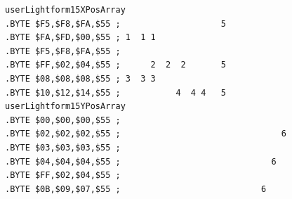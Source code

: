 \begin{minipage}[b]{0.48\linewidth}
\begin{lrbox}{\mybox}%
\hspace{1cm}
\begin{lstlisting}[basicstyle=\ttfamily\tiny,escapechar=\%]
userLightform15XPosArray
.BYTE $F5,$F8,$FA,$55 ;                    5            
.BYTE $FA,$FD,$00,$55 ; 1  1 1                          
.BYTE $F5,$F8,$FA,$55 ;                                 
.BYTE $FF,$02,$04,$55 ;      2  2  2       5            
.BYTE $08,$08,$08,$55 ; 3  3 3                          
.BYTE $10,$12,$14,$55 ;           4  4 4   5            
userLightform15YPosArray
.BYTE $00,$00,$00,$55 ;                                 
.BYTE $02,$02,$02,$55 ;                                6
.BYTE $03,$03,$03,$55 ;                                 
.BYTE $04,$04,$04,$55 ;                              6  
.BYTE $FF,$02,$04,$55 ;                                 
.BYTE $0B,$09,$07,$55 ;                            6    
\end{lstlisting}
\end{lrbox}%
\scalebox{0.8}{\usebox{\mybox}}

\end{minipage}
%
